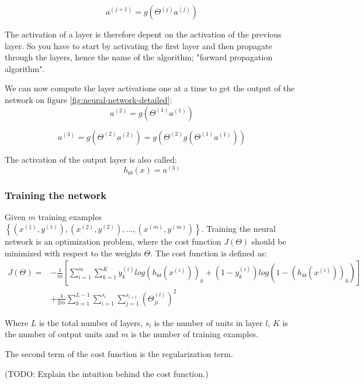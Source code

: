 \begin{equation}
a^{(j+1)} = g(\Theta^{(j)}a^{(j)})
\end{equation}

The activation of a layer is therefore depent on the activation of the previous layer. So you have to start by activating the first layer and then propagate through the layers, hence the name of the algorithm; "forward propagation algorithm".

We can now compute the layer activations one at a time to get the output of the network on figure \ref{fig:neural-network-detailed}:
\begin{equation}
a^{(2)} = g(\Theta^{(1)}a^{(1)})
\end{equation}

\begin{equation}
a^{(3)} = g(\Theta^{(2)}a^{(2)}) = g(\Theta^{(2)} g(\Theta^{(1)}a^{(1)}))
\end{equation}

The activation of the output layer is also called:
\begin{equation}
h_\Theta(x) = a^{(3)}
\end{equation}

\subsubsection{Training the network}
Given $m$ training examples $\left\{(x^{(1)},y^{(1)}), (x^{(2)},y^{(2)}),\dots, (x^{(m)},y^{(m)}) \right\}$.
Training the neural network is an optimization problem, where the cost function $J(\Theta)$ should be minimized with respect to the weights $\Theta$.
The cost function is defined as:
\begin{equation}
\begin{split}
J(\Theta) = &-\frac{1}{m}
\left[
\sum^m_{i=1}\sum^K_{k=1}
y_k^{(i)}
log(h_\Theta(x^{(i)}))_k +
(1-y_k^{(i)})
log(1-(h_\Theta(x^{(i)}))_k)
\right] \\
&+ \frac{\lambda}{2m}
\sum^{L-1}_{k=1}
\sum^{s_l}_{i=1}
\sum^{s_{l+1}}_{j=1}
(\Theta^{(l)}_{ji})^2
\end{split}
\end{equation}

Where $L$ is the total number of layers, $s_l$ is the number of units in layer $l$, $K$ is the number of output units and $m$ is the number of training examples.

The second term of the cost function is the regularization term.

(TODO: Explain the intuition behind the cost function.)

